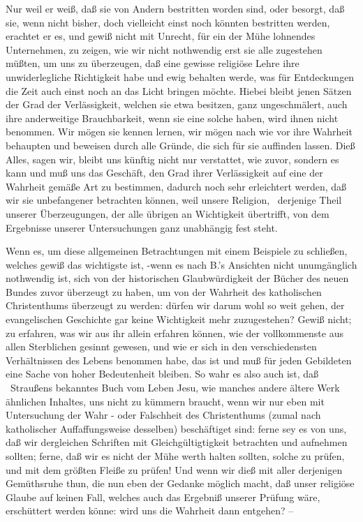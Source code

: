 Nur weil er weiß, daß sie von Andern bestritten worden sind, oder besorgt, daß sie, wenn nicht bisher, doch vielleicht einst noch könnten bestritten werden, erachtet er es, und gewiß nicht mit Unrecht, für ein der Mühe lohnendes Unternehmen, zu zeigen, wie wir nicht nothwendig erst sie alle zugestehen müßten, um uns zu überzeugen, daß eine gewisse religiöse Lehre ihre unwiderlegliche Richtigkeit habe und ewig behalten werde, was für Entdeckungen die Zeit auch einst noch an das Licht bringen möchte. Hiebei bleibt jenen Sätzen der Grad der Verlässigkeit, welchen sie etwa besitzen, ganz ungeschmälert, auch ihre anderweitige Brauchbarkeit, wenn sie eine solche haben, wird ihnen nicht benommen. Wir mögen sie kennen lernen, wir mögen nach wie vor ihre Wahrheit behaupten und beweisen durch alle Gründe, die sich für sie auffinden lassen. Dieß Alles, sagen wir, bleibt uns künftig nicht nur verstattet, wie zuvor, sondern es kann und muß uns das Geschäft, den Grad ihrer Verlässigkeit auf eine der Wahrheit gemäße Art zu bestimmen, dadurch noch sehr erleichtert werden, daß wir sie unbefangener betrachten können, weil unsere Religion, \dh\  derjenige Theil unserer Überzeugungen, der alle übrigen an Wichtigkeit übertrifft, von dem Ergebnisse unserer Untersuchungen ganz unabhängig fest steht. \par
Wenn es, um diese allgemeinen Betrachtungen mit einem Beispiele zu schließen, welches gewiß das wichtigste ist, -wenn es nach B.'s Ansichten nicht unumgänglich nothwendig ist, sich von der historischen Glaubwürdigkeit der Bücher des neuen Bundes zuvor überzeugt zu haben, um von der Wahrheit des katholischen Christenthums überzeugt zu werden: dürfen wir darum wohl so weit gehen, der evangelischen Geschichte gar keine Wichtigkeit mehr zuzugestehen? Gewiß nicht; zu erfahren, was wir aus ihr allein erfahren können, wie der vollkommenste aus allen Sterblichen gesinnt gewesen, und wie er sich in den verschiedensten Verhältnissen des Lebens benommen habe, das ist und muß für jeden Gebildeten eine Sache von hoher Bedeutenheit bleiben. So wahr es also auch ist, daß \zB\ Straußens bekanntes Buch vom Leben Jesu, wie manches andere ältere Werk ähnlichen Inhaltes,  uns nicht zu kümmern braucht, wenn wir nur eben mit Untersuchung der Wahr - oder Falschheit des Christenthums (zumal nach katholischer Auffaffungsweise desselben) beschäftiget sind: ferne sey es von uns, daß wir dergleichen Schriften mit Gleichgültigtigkeit betrachten und aufnehmen sollten; ferne, daß wir es nicht der Mühe werth halten sollten, solche zu prüfen, und mit dem größten Fleiße zu prüfen! Und wenn wir dieß mit aller derjenigen Gemüthsruhe thun, die nun eben der Gedanke möglich macht, daß unser religiöse Glaube auf keinen Fall, welches auch das Ergebniß unserer Prüfung wäre, erschüttert werden könne: wird uns die Wahrheit dann entgehen? --\par
\par


\endinput